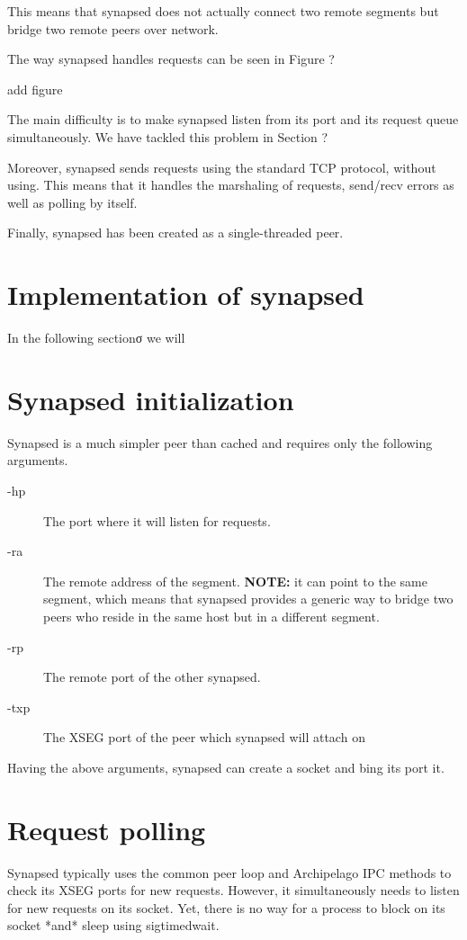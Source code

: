 This means that synapsed does not actually connect two remote segments
but bridge two remote peers over network.

The way synapsed handles requests can be seen in Figure ?

\fixme add figure

The main difficulty is to make synapsed listen from its port and its request 
queue simultaneously. We have tackled this problem in Section ?

Moreover, synapsed sends requests using the standard TCP protocol, without 
using.  This means that it handles the marshaling of requests, send/recv errors 
as well as polling by itself.

Finally, synapsed has been created as a single-threaded peer.

\section{Implementation of synapsed}

In the following sectionσ we will

\section{Synapsed initialization}

Synapsed is a much simpler peer than cached and requires only the following 
arguments.

\begin{description}
	\item[-hp] The port where it will listen for requests.
	\item[-ra] The remote address of the segment. \textbf{NOTE:} it can 
		point to the same segment, which means that synapsed provides a 
		generic way to bridge two peers who reside in the same host but 
		in a different segment.
	\item[-rp] The remote port of the other synapsed.
	\item[-txp] The XSEG port of the peer which synapsed will attach on
\end{description}

Having the above arguments, synapsed can create a socket and bing its port it.  

\section{Request polling}

Synapsed typically uses the common peer loop and Archipelago IPC methods to 
check its XSEG ports for new requests. However, it simultaneously needs to 
listen for new requests on its socket. Yet, there is no way for a process to 
block on its socket *and* sleep using sigtimedwait.

